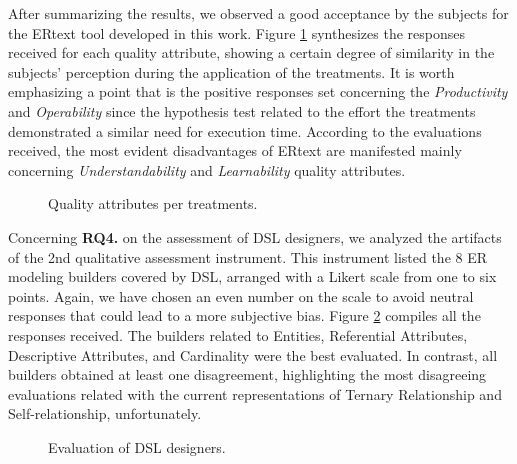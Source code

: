After summarizing the results, we observed a good acceptance by the subjects for the ERtext tool developed in this work.
Figure \ref{fig:inst3GERALExp} synthesizes the responses received for each quality attribute, showing a certain degree of similarity in the subjects' perception during the application of the treatments.
It is worth emphasizing a point that is the positive responses set concerning the \textit{Productivity} and \textit{Operability} since the hypothesis test related to the effort the treatments demonstrated a similar need for execution time.
According to the evaluations received, the most evident disadvantages of ERtext are manifested mainly concerning \textit{Understandability} and \textit{Learnability} quality attributes.

\begin{figure}[!htb]
    \centering
    \caption{Quality attributes per treatments.}
    \label{fig:inst3GERALExp}
    
\end{figure}

Concerning \textbf{RQ4.} on the assessment of DSL designers, we analyzed the artifacts of the 2nd qualitative assessment instrument.
This instrument listed the 8 ER modeling builders covered by DSL, arranged with a Likert scale from one to six points.
Again, we have chosen an even number on the scale to avoid neutral responses that could lead to a more subjective bias.
Figure \ref{fig:inst4GERALExp} compiles all the responses received. 
The builders related to Entities, Referential Attributes, Descriptive Attributes, and Cardinality were the best evaluated.
In contrast, all builders obtained at least one disagreement, highlighting the most disagreeing evaluations related with the current representations of Ternary Relationship and Self-relationship, unfortunately.

\begin{figure}[!htb]
    \centering
    \caption{Evaluation of DSL designers.}
    \label{fig:inst4GERALExp}
    
\end{figure}

